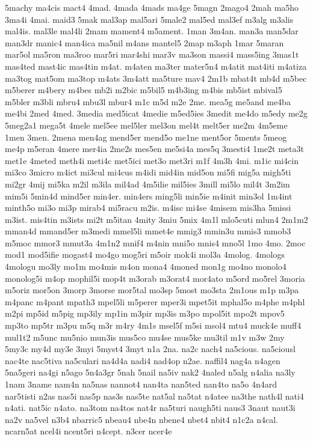 {5machy
ma4cis
mact4
4mad.
4mada
4mads
ma4ge
5magn
2mago4
2mah
ma5ho
3ma4i
4mai.
maid3
5mak
mal3ap
mal5ari
5male2
mal5ed
mal3ef
m3alg
m3alis
mal4is.
mal3le
mal4li
2mam
mament4
m5ament.
1man
3m4an.
man3a
man5dar
man3dr
manic4
man4ica
ma5nil
m4ans
mantel5
2map
m3aph
1mar
5maran
mar5ol
ma5ron
ma3roo
mar5ri
mar4shi
mar3v
ma3son
massi4
mass5ing
3mas1t
mas4ted
mast4ic
mas4tin
m4at.
m4aten
ma3ter
mater5n4
m4atit
mat4iti
m4atiza
ma3tog
mat5om
ma3top
m4ats
3m4att
ma5ture
mav4
2m1b
mbat4t
mb4d
m5bec
m5berer
m4bery
m4bes
mb2i
m2bic
m5bil5
m4b3ing
m4bis
mb5ist
mbival5
m5bler
m3bli
mbru4
mbu3l
mbur4
m1c
m5d
m2e
2me.
mea5g
me5and
me4ba
me4bi
2med
4med.
3media
med5icat
4medie
m5ed5ies
3medit
me4do
m5edy
me2g
5meg2a1
mega5t
4mele
mel5ee
mel5ler
mel3on
mel4t
melt5er
me2m
4m5eme
1men
3men.
2mena
men4ag
mend5er
mend5o
me1ne
ment5or
5ments
5meog
me4p
m5eran
4mere
mer4ia
2me2s
mes5en
me5si4a
mes5q
3mesti4
1me2t
meta3t
met1e
4meted
meth4i
meti4c
met5ici
met3o
met3ri
m1f
4m3h
4mi.
m1ic
mi4cin
mi3co
3micro
m4ict
mi3cul
mi4cus
m4idi
mid4in
mid5on
mi5fi
mig5a
migh5ti
mi2gr
4mij
mi5ka
m2il
m3ila
mil4ad
4m5ilie
mil5ies
3mill
mi5lo
mil4t
3m2im
mim5i
5min4d
mind5er
min4er.
min4ers
ming5li
min5ie
m4init
min3ol
1m4int
minth5o
mi3o
mi3p
mirab4
mi5racu
m2is.
m4isc
mi4se
4misem
mis3ha
5missi
m3ist.
mis4tin
m3ists
mi2t
m5itan
4mity
3miu
5mix
4m1l
mlo5cuti
mlun4
2m1m2
mman4d
mmand5er
m3medi
mmel5li
mmet4e
mmig3
mmin3u
mmis3
mmob3
m5moc
mmor3
mmut3a
4m1n2
mnif4
m4nin
mni5o
mnis4
mno5l
1mo
4mo.
2moc
mod1
mod5ifie
mogast4
mo4go
mog5ri
m5oir
mok4i
mol3a
4molog.
4mologs
4mologu
mo3ly
mo1m
mo4mis
m4on
mona4
4moned
mon1g
mo4no
monolo4
monolog5i
m4op
mophil5i
mop4t
m3orab
m3orat4
mor4ato
m5ord
mo5rel
3moria
m5oriz
mor5on
3morp
3morse
mor5tal
mo3sp
5most
mo3sta
2m1ous
m1p
m3pa
m4panc
m4pant
mpath3
mpel5li
m5perer
mper3i
mpet5it
mphal5o
m4phe
m4phl
m2pi
mp5id
m5pig
mp3ily
mp1in
m3pir
mp3is
m3po
mpol5it
mpo2t
mpov5
mp3to
mp5tr
m3pu
m5q
m3r
m4ry
4m1s
msel5f
m5si
msol4
mtu4
muck4e
muff4
mul1t2
m5unc
mu5nio
mun3is
mus5co
mu4se
mus5ke
mu3til
m1v
m3w
2my
5my3c
my4d
my3e
3myi
5myst4
3myt
n1a
2na.
na2c
nach4
na5cious.
na5ciousl
nac4te
nac5tiva
na5culari
na4d4a
nadi4
nad4op
n2ae.
naffil4
nag4a
n4agen
5na5geri
na4gi
n5ago
5n4a3gr
5nah
5nail
na5iv
nak2
4naled
n5alg
n4alia
na3ly
1nam
3name
nam4n
na5nas
nannot4
nan4ta
nan5ted
nan4to
na5o
4n4ard
nar5tisti
n2as
nas5i
nas5p
nas3s
nas5te
nat5al
na5tat
n4atee
na3the
nath4l
nati4
n4ati.
nat5ic
n4ato.
na3tom
na4tos
nat4r
na5turi
naugh5ti
naus3
3naut
naut3i
na2v
na5vel
n3b4
nbarric5
nbeau4
nbe4n
nbene4
nbet4
nbit4
n1c2a
n4cal.
ncarn5at
ncel4i
ncent5ri
n4cept.
n3cer
ncer4e
}
